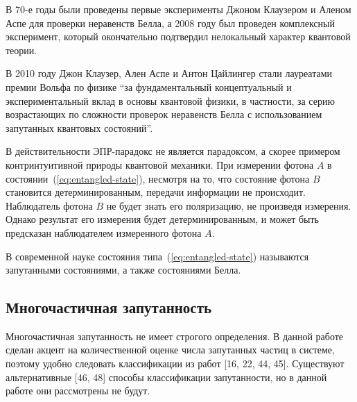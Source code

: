 В 70-е годы были проведены первые эксперименты\cite{Alain1976} Джоном Клаузером и Аленом Аспе для проверки неравенств Белла,
а 2008 году был проведен комплексный эксперимент\cite{Scheidl2010},
который окончательно подтвердил нелокальный характер квантовой теории.

В 2010 году Джон Клаузер, Ален Аспе и Антон Цайлингер стали лауреатами премии Вольфа по физике ``за фундаментальный концептуальный и экспериментальный вклад в основы квантовой физики, в частности, за серию возрастающих по сложности проверок неравенств Белла с использованием запутанных квантовых состояний''.

В действительности  ЭПР-парадокс не является парадоксом,
а скорее примером контринтуитивной природы квантовой механики.
При измерении фотона $A$ в состоянии~(\ref{eq:entangled-state}),
несмотря на то, что состояние фотона $B$ становится детерминированным,
передачи информации не происходит.
Наблюдатель фотона $B$ не будет знать его поляризацию,
не произведя измерения.
Однако результат его измерения будет детерминированным,
и может быть предсказан наблюдателем измеренного фотона $A$.

В современной науке состояния типа~(\ref{eq:entangled-state}) называются запутанными состояниями, а также состояниями Белла.


\subsection{Многочастичная запутанность}


Многочастичная запутанность не имеет строгого определения.
В данной работе сделан акцент на количественной оценке числа запутанных частиц в системе,
поэтому удобно следовать классификации из работ [16, 22, 44, 45].
Существуют альтернативные [46, 48] способы классификации запутанности,
но в данной работе они рассмотрены не будут.

